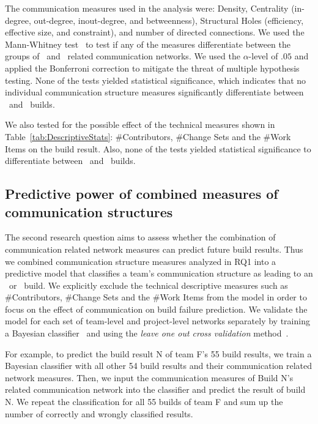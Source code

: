The communication measures used in the analysis were: Density, Centrality
(in-degree, out-degree, inout-degree, and betweenness), Structural Holes
(efficiency, effective size, and constraint), and number of directed connections.
We used the Mann-Whitney test~\cite{Siegel:1956tu} to test if any of the measures
differentiate between the groups of \error\ and \ok\ related communication
networks. We used the $\alpha$-level of $.05$ and applied the Bonferroni
correction to mitigate the threat of multiple hypothesis testing. None of the
tests yielded statistical significance, which indicates that no individual
communication structure measures significantly differentiate between \error\ and
\ok\ builds.

We also tested for the possible effect of the technical measures shown in
Table~\ref{tab:DescriptiveStats}: \#Contributors, \#Change Sets and the \#Work
Items on the build result. Also, none of the tests yielded statistical
significance to differentiate between \error\ and \ok\ builds.


\subsection{Predictive power of combined measures of communication structures}

The second research question aims to assess whether the combination of
communication related network measures can predict future build results. Thus we
combined communication structure measures analyzed in RQ1 into a predictive model
that classifies a team's communication structure as leading to an \error\ or \ok\
build. We explicitly exclude the technical descriptive measures such as
\#Contributors, \#Change Sets and the \#Work Items from the model in order to
focus on the effect of communication on build failure prediction. We validate the
model for each set of team-level and project-level networks separately by
training a Bayesian classifier~\cite{Hastie:2003ys} and using the \emph{leave one
out cross validation} method~\cite{Hastie:2003ys}.

For example, to predict the build result N of team F's 55 build results, we train
a Bayesian classifier with all other 54 build results and their communication
related network measures. Then, we input the communication measures of Build N's
related communication network into the classifier and predict the result of build
N. We repeat the classification for all 55 builds of team F and sum up the number
of correctly and wrongly classified results.

